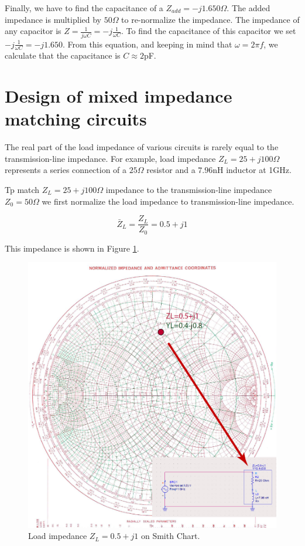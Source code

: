\documentclass{ximera}
\begin{document}
Finally, we have to find the capacitance of a $Z_{add}=-j1.6 50 \Omega$. The added impedance is multiplied by $50 \Omega$ to re-normalize the impedance. The impedance of any capacitor is $Z=\frac{1}{j \omega C}=-j \frac{1}{\omega C}$. To find the capacitance of this capacitor we set $-j \frac{1}{\omega C}=-j1.6 50$. From this equation, and keeping in mind that $\omega = 2 \pi f$, we calculate that the capacitance is $C \approx 2$pF.



\section{Design of mixed impedance matching circuits}

The real part of the load impedance of various circuits is rarely equal to the transmission-line impedance. For example, load impedance $Z_L=25+j 100 \Omega$ represents a series connection of a $25\Omega$ resistor and a $7.96$nH inductor at 1GHz.

Tp match $Z_L=25+j 100 \Omega$ impedance to the transmission-line impedance $Z_0=50 \Omega$ we first normalize the load impedance to transmission-line impedance.


\begin{equation}
\bar{Z}_L=\frac{Z_L}{Z_0}=0.5+j1
\end{equation}

This impedance is shown in Figure \ref{fig:PointSC}. 

\begin{figure}[htbp]
\begin{center}
\includegraphics[scale=0.4]{../jpg/Match1.jpg}
\end{center}
\caption{Load impedance $Z_L=0.5+j1$ on Smith Chart.}
\label{fig:PointSC}
\end{figure}
\end{document}
